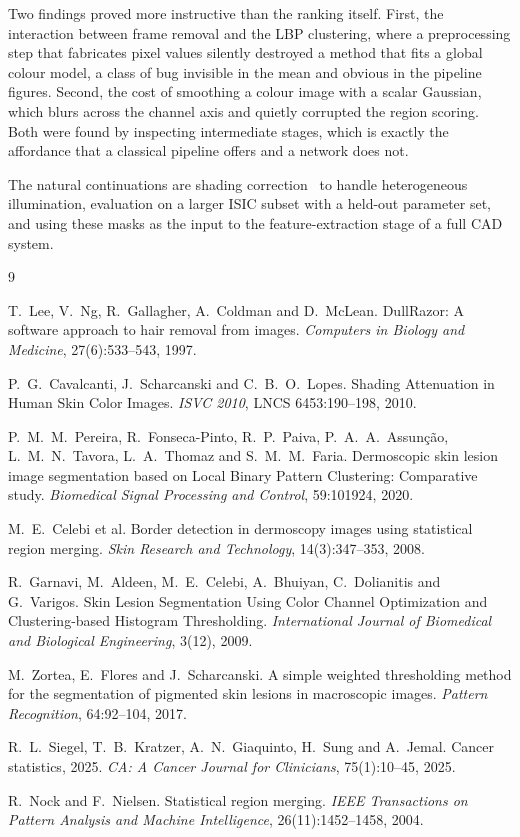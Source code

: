 \documentclass[11pt,a4paper]{article}
\begin{document}
Two findings proved more instructive than the ranking itself. First, the
interaction between frame removal and the LBP clustering, where a preprocessing
step that fabricates pixel values silently destroyed a method that fits a global
colour model, a class of bug invisible in the mean and obvious in the pipeline
figures. Second, the cost of smoothing a colour image with a scalar Gaussian,
which blurs across the channel axis and quietly corrupted the region scoring.
Both were found by inspecting intermediate stages, which is exactly the
affordance that a classical pipeline offers and a network does not.

The natural continuations are shading correction~\cite{cavalcanti} to handle
heterogeneous illumination, evaluation on a larger ISIC subset with a held-out
parameter set, and using these masks as the input to the feature-extraction
stage of a full CAD system.

\begin{thebibliography}{9}

T.~Lee, V.~Ng, R.~Gallagher, A.~Coldman and D.~McLean.
\newblock DullRazor: A software approach to hair removal from images.
\newblock \emph{Computers in Biology and Medicine}, 27(6):533--543, 1997.

P.~G.~Cavalcanti, J.~Scharcanski and C.~B.~O.~Lopes.
\newblock Shading Attenuation in Human Skin Color Images.
\newblock \emph{ISVC 2010}, LNCS 6453:190--198, 2010.

P.~M.~M.~Pereira, R.~Fonseca-Pinto, R.~P.~Paiva, P.~A.~A.~Assunção,
L.~M.~N.~Tavora, L.~A.~Thomaz and S.~M.~M.~Faria.
\newblock Dermoscopic skin lesion image segmentation based on Local Binary
Pattern Clustering: Comparative study.
\newblock \emph{Biomedical Signal Processing and Control}, 59:101924, 2020.

M.~E.~Celebi et al.
\newblock Border detection in dermoscopy images using statistical region
merging.
\newblock \emph{Skin Research and Technology}, 14(3):347--353, 2008.

R.~Garnavi, M.~Aldeen, M.~E.~Celebi, A.~Bhuiyan, C.~Dolianitis and G.~Varigos.
\newblock Skin Lesion Segmentation Using Color Channel Optimization and
Clustering-based Histogram Thresholding.
\newblock \emph{International Journal of Biomedical and Biological
Engineering}, 3(12), 2009.

M.~Zortea, E.~Flores and J.~Scharcanski.
\newblock A simple weighted thresholding method for the segmentation of
pigmented skin lesions in macroscopic images.
\newblock \emph{Pattern Recognition}, 64:92--104, 2017.

R.~L.~Siegel, T.~B.~Kratzer, A.~N.~Giaquinto, H.~Sung and A.~Jemal.
\newblock Cancer statistics, 2025.
\newblock \emph{CA: A Cancer Journal for Clinicians}, 75(1):10--45, 2025.

R.~Nock and F.~Nielsen.
\newblock Statistical region merging.
\newblock \emph{IEEE Transactions on Pattern Analysis and Machine
Intelligence}, 26(11):1452--1458, 2004.

\end{thebibliography}
\end{document}
